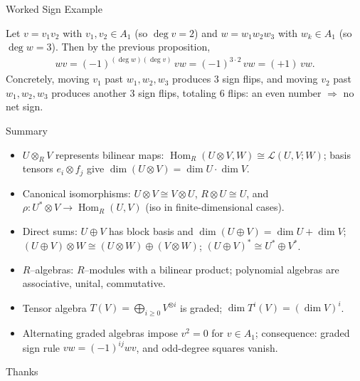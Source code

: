 \begin{frame}{Worked Sign Example}
\begin{block}{}

\end{block}
Let $v=v_1 v_2$ with $v_1,v_2\in A_1$ (so $\deg v=2$) and $w=w_1 w_2 w_3$ with $w_k\in A_1$ (so $\deg w=3$).
Then by the previous proposition,
\begin{align*}
w v = (-1)^{(\deg w)(\deg v)}\, v w = (-1)^{3\cdot 2}\, v w = (+1)\, v w.
\end{align*}
Concretely, moving $v_1$ past $w_1,w_2,w_3$ produces $3$ sign flips, and moving $v_2$ past $w_1,w_2,w_3$ produces another $3$ sign flips, totaling $6$ flips: an even number $\Rightarrow$ no net sign.
\end{frame}

\begin{frame}{Summary}
\begin{itemize}
\item $U\otimes_R V$ represents bilinear maps: $\operatorname{Hom}_R(U\otimes V,W)\cong \mathcal{L}(U,V;W)$; basis tensors $e_i\otimes f_j$ give $\dim(U\otimes V)=\dim U\cdot \dim V$.
\item Canonical isomorphisms: $U\otimes V \cong V\otimes U$, $R\otimes U \cong U$, and $\rho:U^*\otimes V\to \operatorname{Hom}_R(U,V)$ (iso in finite-dimensional cases).
\item Direct sums: $U\oplus V$ has block basis and $\dim(U\oplus V)=\dim U+\dim V$; $(U\oplus V)\otimes W \cong (U\otimes W)\oplus (V\otimes W)$; $(U\oplus V)^*\cong U^*\oplus V^*$.
\item $R$–algebras: $R$–modules with a bilinear product; polynomial algebras are associative, unital, commutative.
\item Tensor algebra $T(V)=\bigoplus_{i\ge 0} V^{\otimes i}$ is graded; $\dim T^i(V)= (\dim V)^i$.
\item Alternating graded algebras impose $v^2=0$ for $v\in A_1$; consequence: graded sign rule $vw=(-1)^{ij}wv$, and odd-degree squares vanish.
\end{itemize}
\end{frame}

\begin{frame}{Thanks}
  \cmcendframe
\end{frame}


